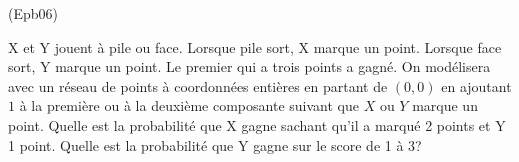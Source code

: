 \begin{tiny}(Epb06)\end{tiny} X et Y jouent à pile ou face. Lorsque pile sort, X marque un point. Lorsque face sort, Y marque un point. Le premier qui a trois points a gagné. On modélisera avec un réseau de points à coordonnées entières en partant de $(0,0)$ en ajoutant $1$ à la première ou à la deuxième composante suivant que $X$ ou $Y$ marque un point. \newline
Quelle est la probabilité que X gagne sachant qu'il a marqué 2 points et Y 1 point. Quelle est la probabilité que Y gagne sur le score de 1 à 3?   
